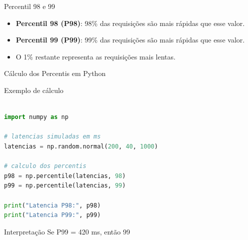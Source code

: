 \documentclass[9pt]{beamer}
\begin{document}
\begin{frame}{Percentil 98 e 99}

\begin{center}
\end{center}

\begin{itemize}
\item \textbf{Percentil 98 (P98)}: 98\% das requisições são mais rápidas que esse valor.
\item \textbf{Percentil 99 (P99)}: 99\% das requisições são mais rápidas que esse valor.
\item O 1\% restante representa as requisições mais lentas.
\end{itemize}

\end{frame}
\begin{frame}[fragile]{Cálculo dos Percentis em Python}

\begin{block}{Exemplo de cálculo}
\end{block}

\begin{lstlisting}[language=Python]

import numpy as np

# latencias simuladas em ms
latencias = np.random.normal(200, 40, 1000)

# calculo dos percentis
p98 = np.percentile(latencias, 98)
p99 = np.percentile(latencias, 99)

print("Latencia P98:", p98)
print("Latencia P99:", p99)

\end{lstlisting}

\begin{block}{Interpretação}
Se P99 = 420 ms, então 99%
\end{block}

\end{frame}
\end{document}
